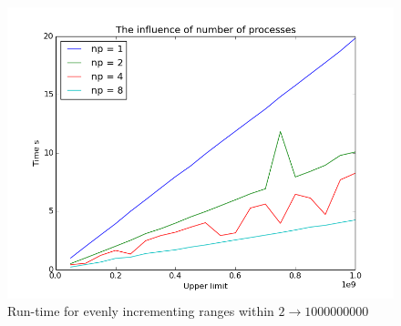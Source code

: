 \documentclass[paper=a4, fontsize=11pt]{scrartcl} %
\numberwithin{equation}{section} %
\numberwithin{figure}{section} %
\numberwithin{table}{section} %
\begin{document}
\begin{figure}[H]
    \centering
    \includegraphics[width=\linewidth]{high.png}
    \caption{Run-time for evenly incrementing ranges within $2 \rightarrow 1000000000$} \label{fig:high}
\end{figure}

\end{document}
